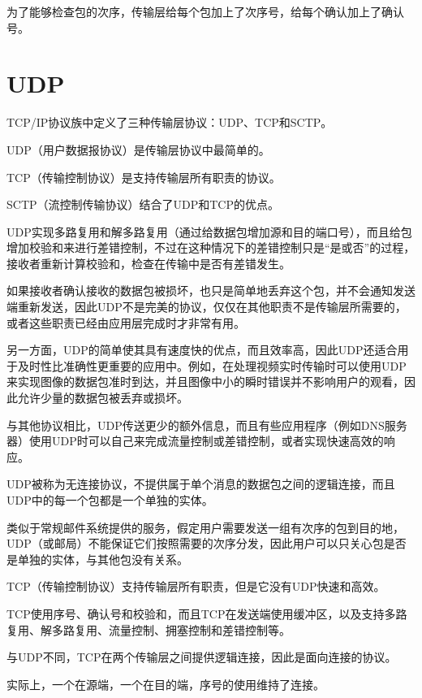 为了能够检查包的次序，传输层给每个包加上了次序号，给每个确认加上了确认号。


\section{UDP}


TCP/IP协议族中定义了三种传输层协议：UDP、TCP和SCTP。

\begin{compactitem}
\item UDP（用户数据报协议）是传输层协议中最简单的。
\item TCP（传输控制协议）是支持传输层所有职责的协议。
\item SCTP（流控制传输协议）结合了UDP和TCP的优点。
\end{compactitem}




UDP实现多路复用和解多路复用（通过给数据包增加源和目的端口号），而且给包增加校验和来进行差错控制，不过在这种情况下的差错控制只是“是或否”的过程，接收者重新计算校验和，检查在传输中是否有差错发生。

如果接收者确认接收的数据包被损坏，也只是简单地丢弃这个包，并不会通知发送端重新发送，因此UDP不是完美的协议，仅仅在其他职责不是传输层所需要的，或者这些职责已经由应用层完成时才非常有用。

另一方面，UDP的简单使其具有速度快的优点，而且效率高，因此UDP还适合用于及时性比准确性更重要的应用中。例如，在处理视频实时传输时可以使用UDP来实现图像的数据包准时到达，并且图像中小的瞬时错误并不影响用户的观看，因此允许少量的数据包被丢弃或损坏。

与其他协议相比，UDP传送更少的额外信息，而且有些应用程序（例如DNS服务器）使用UDP时可以自己来完成流量控制或差错控制，或者实现快速高效的响应。

UDP被称为无连接协议，不提供属于单个消息的数据包之间的逻辑连接，而且UDP中的每一个包都是一个单独的实体。

类似于常规邮件系统提供的服务，假定用户需要发送一组有次序的包到目的地，UDP（或邮局）不能保证它们按照需要的次序分发，因此用户可以只关心包是否是单独的实体，与其他包没有关系。

TCP（传输控制协议）支持传输层所有职责，但是它没有UDP快速和高效。

TCP使用序号、确认号和校验和，而且TCP在发送端使用缓冲区，以及支持多路复用、解多路复用、流量控制、拥塞控制和差错控制等。

与UDP不同，TCP在两个传输层之间提供逻辑连接，因此是面向连接的协议。

实际上，一个在源端，一个在目的端，序号的使用维持了连接。

